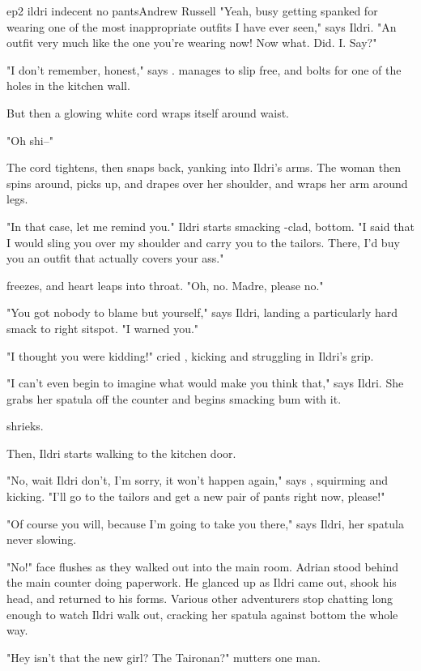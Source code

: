 \documentclass{book}
\begin{document}
\begin{childnode}{ep2 ildri indecent no pants}{Andrew Russell}
"Yeah, busy getting spanked for wearing one of the most inappropriate outfits I have ever seen," says Ildri. "An outfit very much like the one you're wearing now! Now what. Did. I. Say?"

"I don't remember, honest," says \name{}. \HeShe{} manages to slip free, and bolts for one of the holes in the kitchen wall.

But then a glowing white cord wraps itself around \names{} waist.

"Oh shi--"

The cord tightens, then snaps back, yanking \name{} into Ildri's arms. The woman then spins \name{} around, picks \himher{} up, and drapes \himher{} over her shoulder, and wraps her arm around
\names{} legs.

"In that case, let me remind you." Ildri starts smacking \names{} \trousers{}-clad, \bumadj{} bottom. "I said that I would sling you over my shoulder and carry you to the tailors. There, I'd buy
you an outfit that actually covers your ass."

\name{} freezes, and \hisher{} heart leaps into \hisher{} throat. "Oh, no. Madre, please no."

"You got nobody to blame but yourself," says Ildri, landing a particularly hard smack to \names{} right sitspot. "I warned you."

"I thought you were kidding!" cried \name{}, kicking and struggling in Ildri's grip.

"I can't even begin to imagine what would make you think that," says Ildri. She grabs her spatula off the counter and begins smacking \names{} \muscleadj{} bum with it.

\name{} shrieks.

Then, Ildri starts walking to the kitchen door.

"No, wait Ildri don't, I'm sorry, it won't happen again," says \name{}, squirming and kicking. "I'll go to the tailors and get a new pair of pants right now, please!"

"Of course you will, because I'm going to take you there," says Ildri, her spatula never slowing.

"No!" \names{} face flushes as they walked out into the main room. Adrian stood behind the main counter doing paperwork. He glanced up as Ildri came out, shook his head, and returned to
his forms. Various other adventurers stop chatting long enough to watch Ildri walk out, cracking her spatula against \names{} bottom the whole way.

"Hey isn't that the new girl? The Taironan?" mutters one man.


\end{childnode}
\end{document}
